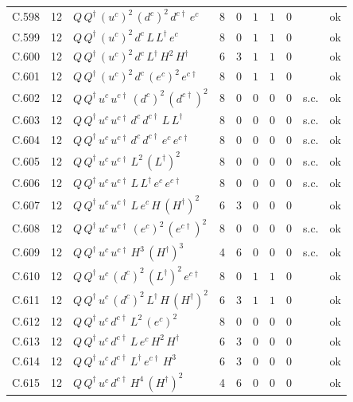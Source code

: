 {\begin{longtable}{@{}ll>{\raggedright\arraybackslash}p{6.4cm}rrllllr@{}}
C.598 & 12 & $Q\,Q^\dagger\,(u^c)^{2}\,(d^c)^{2}\,d^{c\dagger}\,e^c$ & 8 & 0 & $1$ & $1$ & $0$ &  & ok \\
C.599 & 12 & $Q\,Q^\dagger\,(u^c)^{2}\,d^c\,L\,L^\dagger\,e^c$ & 8 & 0 & $1$ & $1$ & $0$ &  & ok \\
C.600 & 12 & $Q\,Q^\dagger\,(u^c)^{2}\,d^c\,L^\dagger\,H^{2}\,H^\dagger$ & 6 & 3 & $1$ & $1$ & $0$ &  & ok \\
C.601 & 12 & $Q\,Q^\dagger\,(u^c)^{2}\,d^c\,(e^c)^{2}\,e^{c\dagger}$ & 8 & 0 & $1$ & $1$ & $0$ &  & ok \\
C.602 & 12 & $Q\,Q^\dagger\,u^c\,u^{c\dagger}\,(d^c)^{2}\,(d^{c\dagger})^{2}$ & 8 & 0 & $0$ & $0$ & $0$ & s.c. & ok \\
C.603 & 12 & $Q\,Q^\dagger\,u^c\,u^{c\dagger}\,d^c\,d^{c\dagger}\,L\,L^\dagger$ & 8 & 0 & $0$ & $0$ & $0$ & s.c. & ok \\
C.604 & 12 & $Q\,Q^\dagger\,u^c\,u^{c\dagger}\,d^c\,d^{c\dagger}\,e^c\,e^{c\dagger}$ & 8 & 0 & $0$ & $0$ & $0$ & s.c. & ok \\
C.605 & 12 & $Q\,Q^\dagger\,u^c\,u^{c\dagger}\,L^{2}\,(L^\dagger)^{2}$ & 8 & 0 & $0$ & $0$ & $0$ & s.c. & ok \\
C.606 & 12 & $Q\,Q^\dagger\,u^c\,u^{c\dagger}\,L\,L^\dagger\,e^c\,e^{c\dagger}$ & 8 & 0 & $0$ & $0$ & $0$ & s.c. & ok \\
C.607 & 12 & $Q\,Q^\dagger\,u^c\,u^{c\dagger}\,L\,e^c\,H\,(H^\dagger)^{2}$ & 6 & 3 & $0$ & $0$ & $0$ &  & ok \\
C.608 & 12 & $Q\,Q^\dagger\,u^c\,u^{c\dagger}\,(e^c)^{2}\,(e^{c\dagger})^{2}$ & 8 & 0 & $0$ & $0$ & $0$ & s.c. & ok \\
C.609 & 12 & $Q\,Q^\dagger\,u^c\,u^{c\dagger}\,H^{3}\,(H^\dagger)^{3}$ & 4 & 6 & $0$ & $0$ & $0$ & s.c. & ok \\
C.610 & 12 & $Q\,Q^\dagger\,u^c\,(d^c)^{2}\,(L^\dagger)^{2}\,e^{c\dagger}$ & 8 & 0 & $1$ & $1$ & $0$ &  & ok \\
C.611 & 12 & $Q\,Q^\dagger\,u^c\,(d^c)^{2}\,L^\dagger\,H\,(H^\dagger)^{2}$ & 6 & 3 & $1$ & $1$ & $0$ &  & ok \\
C.612 & 12 & $Q\,Q^\dagger\,u^c\,d^{c\dagger}\,L^{2}\,(e^c)^{2}$ & 8 & 0 & $0$ & $0$ & $0$ &  & ok \\
C.613 & 12 & $Q\,Q^\dagger\,u^c\,d^{c\dagger}\,L\,e^c\,H^{2}\,H^\dagger$ & 6 & 3 & $0$ & $0$ & $0$ &  & ok \\
C.614 & 12 & $Q\,Q^\dagger\,u^c\,d^{c\dagger}\,L^\dagger\,e^{c\dagger}\,H^{3}$ & 6 & 3 & $0$ & $0$ & $0$ &  & ok \\
C.615 & 12 & $Q\,Q^\dagger\,u^c\,d^{c\dagger}\,H^{4}\,(H^\dagger)^{2}$ & 4 & 6 & $0$ & $0$ & $0$ &  & ok \\

\end{longtable}}
